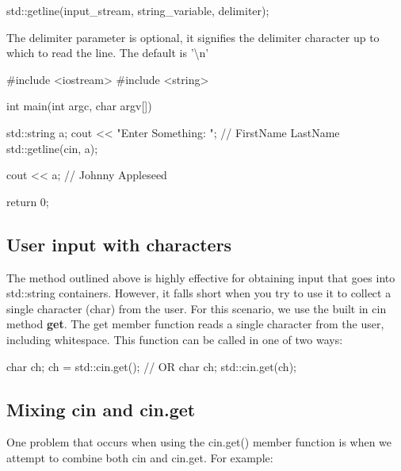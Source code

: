 \documentclass{report}
\begin{document}
    \begin{cppcode}
                    std::getline(input_stream, string_variable, delimiter);
    \end{cppcode}
    \bigbreak \noindent 
    
    \begin{notebox}
			The delimiter parameter is optional, it signifies the delimiter character up to which to read the line. The default is '\textbackslash n'
		\end{notebox}
    \bigbreak \noindent 
    
    \begin{cppcode}
#include <iostream>
#include <string>

int main(int argc, char argv[]){

    std::string a;
    cout << "Enter Something: "; // FirstName LastName
    std::getline(cin, a);

    cout << a; // Johnny Appleseed

    return 0;
}
    \end{cppcode}
    

    \pagebreak \bigbreak \noindent 
    \subsection{User input with characters}
    \bigbreak \noindent 
    The method outlined above is highly effective for obtaining input that goes into std::string containers. However, it falls short when you try to use it to collect a single character (char) from the user. 
    \bigbreak \noindent 
    For this scenario, we use the built in cin method \textbf{get}. The get member function reads a single character from the user, including whitespace. 
    \bigbreak \noindent 
    This function can be called in one of two ways:
    \smallbreak \noindent
    
    \begin{cppcode}
char ch;
ch = std::cin.get();
// OR 
char ch;
std::cin.get(ch);
    \end{cppcode}
    

    \bigbreak \noindent 
    \subsection{Mixing cin and cin.get}
    \bigbreak \noindent 
    One problem that occurs when using the cin.get() member function is when we attempt to combine both cin and cin.get. For example:
    \smallbreak \noindent
    
\end{document}
